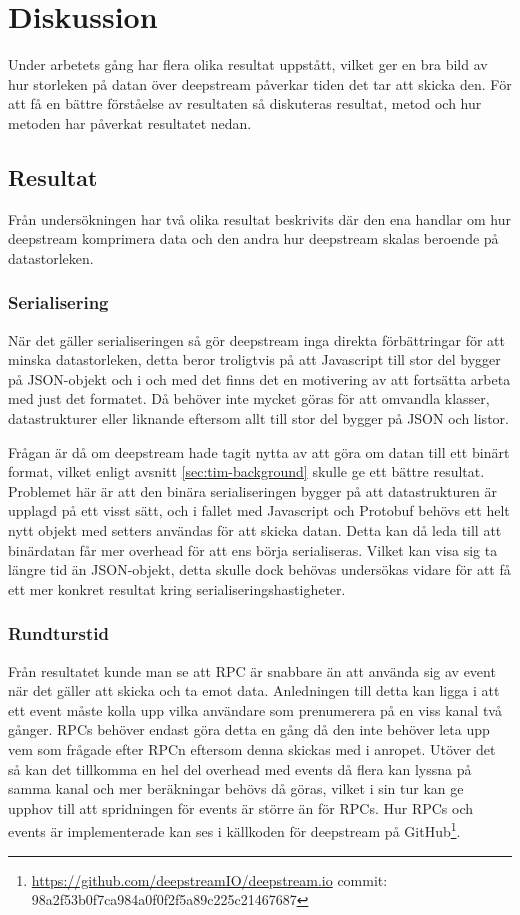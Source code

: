 \section{Diskussion}
\label{sec:tim-discussion}
Under arbetets gång har flera olika resultat uppstått, vilket ger en bra bild av hur storleken på datan över deepstream påverkar tiden det tar att skicka den. För att få en bättre förståelse av resultaten så diskuteras resultat, metod och hur metoden har påverkat resultatet nedan. 

\subsection{Resultat}
\label{subsec:tim-discussion-results}
Från undersökningen har två olika resultat beskrivits där den ena handlar om hur deepstream komprimera data och den andra hur deepstream skalas beroende på datastorleken.

\subsubsection{Serialisering}
När det gäller serialiseringen så gör deepstream inga direkta förbättringar för att minska datastorleken, detta beror troligtvis på att Javascript till stor del bygger på JSON-objekt och i och med det finns det en motivering av att fortsätta arbeta med just det formatet. Då behöver inte mycket göras för att omvandla klasser, datastrukturer eller liknande eftersom allt till stor del bygger på JSON och listor.

Frågan är då om deepstream hade tagit nytta av att göra om datan till ett binärt format, vilket enligt avsnitt \ref{sec:tim-background} skulle ge ett bättre resultat. Problemet här är att den binära serialiseringen bygger på att datastrukturen är upplagd på ett visst sätt, och i fallet med Javascript och Protobuf behövs ett helt nytt objekt med setters användas för att skicka datan. Detta kan då leda till att binärdatan får mer overhead för att ens börja serialiseras. Vilket kan visa sig ta längre tid än JSON-objekt, detta skulle dock behövas undersökas vidare för att få ett mer konkret resultat kring serialiseringshastigheter.

\subsubsection{Rundturstid}
Från resultatet kunde man se att RPC är snabbare än att använda sig av event när det gäller att skicka och ta emot data. Anledningen till detta kan ligga i att ett event måste kolla upp vilka användare som prenumerera på en viss kanal två gånger. RPCs behöver endast göra detta en gång då den inte behöver leta upp vem som frågade efter RPCn eftersom denna skickas med i anropet. Utöver det så kan det tillkomma en hel del overhead med events då flera kan lyssna på samma kanal och mer beräkningar behövs då göras, vilket i sin tur kan ge upphov till att spridningen för events är större än för RPCs. Hur RPCs och events är implementerade kan ses i källkoden för deepstream på GitHub\footnote{\url{https://github.com/deepstreamIO/deepstream.io} \newline commit: 98a2f53b0f7ca984a0f0f2f5a89c225c21467687}. 

